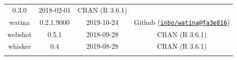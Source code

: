 \documentclass[11pt,]{book}
\begin{document}
\begin{longtable}[]{@{}cccc@{}}
\begin{minipage}[t]{0.19\columnwidth}
0.3.0\strut
\end{minipage} & \begin{minipage}[t]{0.16\columnwidth}\centering\strut
2018-02-01\strut
\end{minipage} & \begin{minipage}[t]{0.36\columnwidth}\centering\strut
CRAN (R 3.6.1)\strut
\end{minipage}\tabularnewline
\begin{minipage}[t]{0.18\columnwidth}\centering\strut
watina\strut
\end{minipage} & \begin{minipage}[t]{0.19\columnwidth}\centering\strut
0.2.1.9000\strut
\end{minipage} & \begin{minipage}[t]{0.16\columnwidth}\centering\strut
2019-10-24\strut
\end{minipage} & \begin{minipage}[t]{0.36\columnwidth}\centering\strut
Github
(\href{mailto:inbo/watina@fa3e816}{\nolinkurl{inbo/watina@fa3e816}})\strut
\end{minipage}\tabularnewline
\begin{minipage}[t]{0.18\columnwidth}\centering\strut
webshot\strut
\end{minipage} & \begin{minipage}[t]{0.19\columnwidth}\centering\strut
0.5.1\strut
\end{minipage} & \begin{minipage}[t]{0.16\columnwidth}\centering\strut
2018-09-28\strut
\end{minipage} & \begin{minipage}[t]{0.36\columnwidth}\centering\strut
CRAN (R 3.6.1)\strut
\end{minipage}\tabularnewline
\begin{minipage}[t]{0.18\columnwidth}\centering\strut
whisker\strut
\end{minipage} & \begin{minipage}[t]{0.19\columnwidth}\centering\strut
0.4\strut
\end{minipage} & \begin{minipage}[t]{0.16\columnwidth}\centering\strut
2019-08-28\strut
\end{minipage} & \begin{minipage}[t]{0.36\columnwidth}\centering\strut
CRAN (R 3.6.1)\strut
\end{minipage}\tabularnewline
\begin{minipage}[t]{0.18\columnwidth}\centering\strut

\end{minipage}
\end{longtable}
\end{document}
